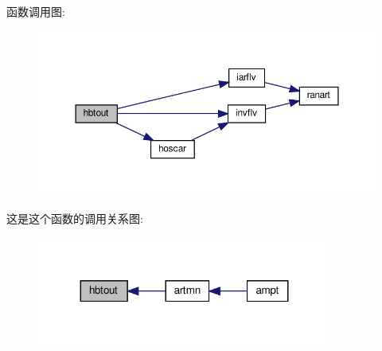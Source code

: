 函数调用图\+:
\nopagebreak
\begin{figure}[H]
\begin{center}
\leavevmode
\includegraphics[width=350pt]{hbtout_8f90_a872f8247d4137cfd3719c650292295fd_cgraph}
\end{center}
\end{figure}
这是这个函数的调用关系图\+:
\nopagebreak
\begin{figure}[H]
\begin{center}
\leavevmode
\includegraphics[width=275pt]{hbtout_8f90_a872f8247d4137cfd3719c650292295fd_icgraph}
\end{center}
\end{figure}

